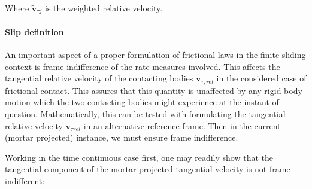 \documentclass[a4paper,10pt]{article} %
\begin{document}
Where $\tilde{\mathbf{v}}_{\tau j}$ is the weighted relative velocity.

\paragraph{Slip definition}

An important aspect of a proper formulation of frictional laws in the finite sliding context is frame indifference\cite{gitt1, laursen2} of the rate measures involved. This affects the tangential relative velocity of the contacting bodies $\mathbf{v}_{\tau, rel}$ in the considered case of frictional contact. This assures that this quantity is unaffected by any rigid body motion which the two contacting bodies might experience at the instant of question. Mathematically, this can be tested with formulating the tangential relative velocity $\mathbf{v}_{\tau rel}$  in an alternative reference frame. Then in the current (mortar projected) instance, we must ensure frame indifference.

Working in the time continuous case first, one may readily show that the tangential component of the mortar projected tangential velocity is not frame indifferent:
\end{document}
